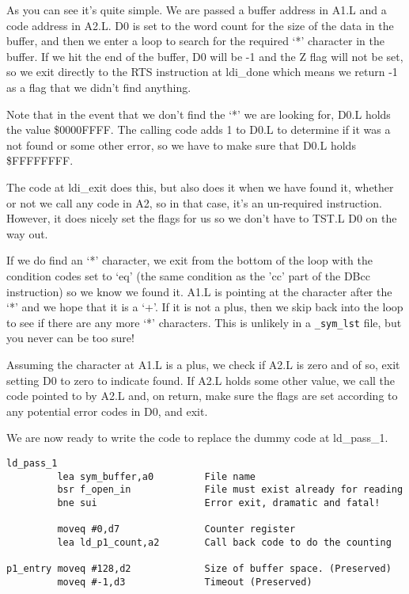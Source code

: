As you can see it's quite simple. We are passed a buffer address in
    A1.L and a code address in A2.L. D0 is set to the word count for the size
    of the data in the buffer, and then we enter a loop to search for the
    required `*' character in the buffer. If we hit the end of the buffer, D0
    will be -{}1 and the Z flag will not be set, so we exit directly to the RTS
    instruction at ldi\_done which means we return -{}1 as a
    flag that we didn't find anything.

Note that in the event that we don't find the `*' we are looking
    for, D0.L holds the value \$0000FFFF. The calling code adds 1 to D0.L to
    determine if it was a not found or some other error, so we have to make
    sure that D0.L holds \$FFFFFFFF.

The code at ldi\_exit does this, but also does
    it when we have found it, whether or not we call any code in A2, so in
    that case, it's an un-{}required instruction. However, it does nicely set
    the flags for us so we don't have to TST.L D0 on the way out.

If we do find an `*' character, we exit from the bottom of the loop
    with the condition codes set to `eq' (the same condition as the 'cc' part
    of the DBcc instruction) so we know we found it. A1.L is pointing at the
    character after the `*' and we hope that it is a `+'. If it is not a plus,
    then we skip back into the loop to see if there are any more `*'
    characters. This is unlikely in a \nolinkurl{_sym_lst} file, but
    you never can be too sure!

Assuming the character at A1.L is a plus, we check if A2.L is zero
    and of so, exit setting D0 to zero to indicate found. If A2.L holds some
    other value, we call the code pointed to by A2.L and, on return, make sure
    the flags are set according to any potential error codes in D0, and
    exit.

We are now ready to write the code to replace the dummy code at
 ld\_pass\_1.

\begin{lstlisting}[firstnumber=1,]
ld_pass_1 
         lea sym_buffer,a0         File name
         bsr f_open_in             File must exist already for reading
         bne sui                   Error exit, dramatic and fatal!

         moveq #0,d7               Counter register
         lea ld_p1_count,a2        Call back code to do the counting

p1_entry moveq #128,d2             Size of buffer space. (Preserved)
         moveq #-1,d3              Timeout (Preserved)
\end{lstlisting}


